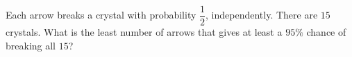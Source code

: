 Each arrow breaks a crystal with probability $\dfrac12$, independently. There are $15$ crystals. What is the least number of arrows that gives at least a $95\%$ chance of breaking all $15$?
